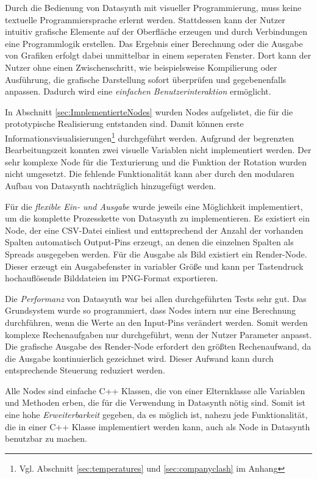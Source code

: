 \documentclass[a4paper, 
               12pt,
               DIV=calc,
               version=first,
               pdftex,
               headsepline,
               footsepline,
               bibtotocnumbered,
               liststotocnumbered]{scrreprt}
\begin{document}
Durch die Bedienung von Datasynth mit visueller Programmierung, muss keine
textuelle Programmiersprache erlernt werden. Stattdessen kann der Nutzer intuitiv
grafische Elemente auf der Oberfläche erzeugen und durch Verbindungen
eine Programmlogik erstellen. Das Ergebnis einer Berechnung oder die Ausgabe von
Grafiken erfolgt dabei unmittelbar in einem seperaten Fenster. Dort kann der Nutzer
ohne einen Zwischenschritt, wie beispielsweise Kompilierung oder Ausführung,
die grafische Darstellung sofort überprüfen und gegebenenfalls anpassen. Dadurch wird eine
\textit{einfachen Benutzerinteraktion} ermöglicht.

In Abschnitt \ref{sec:ImplementierteNodes} wurden Nodes aufgelistet,
die für die prototypische Realisierung entstanden sind. Damit können erste Informationsvisualisierungen\footnote{Vgl. Abschnitt
\ref{sec:temperatures} und \ref{sec:companyclash} im Anhang} durchgeführt werden.
Aufgrund der begrenzten Bearbeitungszeit konnten zwei visuelle
Variablen nicht implementiert werden. Der sehr komplexe Node für die Texturierung
und die Funktion der Rotation wurden nicht umgesetzt. Die fehlende Funktionalität kann aber
durch den modularen Aufbau von Datasynth nachträglich hinzugefügt werden.

Für die \textit{flexible Ein- und Ausgabe} wurde jeweils eine Möglichkeit implementiert, um die komplette
Prozesskette von Datasynth zu implementieren. Es existiert ein Node, der eine
CSV-Datei einliest und enttsprechend der Anzahl der vorhanden
Spalten automatisch Output-Pins erzeugt, an denen die einzelnen Spalten als
Spreads ausgegeben werden. Für die Ausgabe als Bild existiert ein Render-Node.
Dieser erzeugt ein Ausgabefenster in variabler Größe und kann per Tastendruck
hochauflösende Bilddateien im PNG-Format exportieren.

Die \textit{Performanz} von Datasynth war bei allen durchgeführten Tests sehr gut. Das Grundsystem wurde so
programmiert, dass Nodes intern nur eine Berechnung durchführen, wenn die Werte
an den Input-Pins verändert werden. Somit werden komplexe Rechenaufgaben nur
durchgeführt, wenn der Nutzer Parameter anpasst. Die grafische Ausgabe
des Render-Node erfordert den größten Rechenaufwand, da die Ausgabe kontinuierlich
gezeichnet wird. Dieser Aufwand kann durch entsprechende Steuerung
reduziert werden.

Alle Nodes sind einfache C++ Klassen, die von einer Elternklasse
alle Variablen und Methoden erben, die für die Verwendung in Datasynth
nötig sind. Somit ist eine hohe \textit{Erweiterbarkeit} gegeben, da es möglich ist,
nahezu jede Funktionalität, die in einer C++ Klasse implementiert werden kann, auch
als Node in Datasynth benutzbar zu machen.
\end{document}
